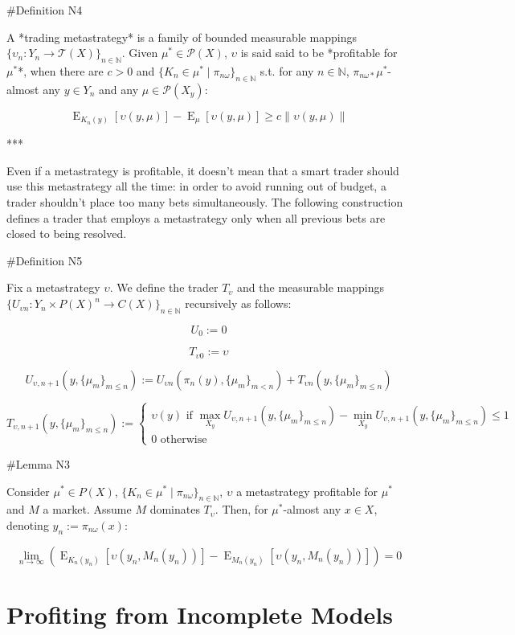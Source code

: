 \documentclass[a4paper]{article}
\DeclareMathOperator{\E}{E}
\newcommand{\Nats}{\mathbb{N}}
\newcommand{\Norm}[1]{\lVert #1 \rVert}
\newcommand{\Prob}{\mathcal{P}}
\newcommand{\T}{\mathcal{T}}
\begin{document}
\#Definition N4

A *trading metastrategy* is a family of bounded measurable mappings ${\{\upsilon_n: Y_n \rightarrow \T(X)\}_{n \in \Nats}}$. Given ${\mu^* \in \Prob(X)}$, ${\upsilon}$ is said said to be *profitable for ${\mu^*}$*, when there are ${c > 0}$ and ${\{K_n \in \mu^* \mid \pi_{n\omega}\}_{n \in \Nats}}$ s.t. for any ${n \in \Nats}$, ${\pi_{n\omega*}\mu^*}$-almost any ${y \in Y_n}$ and any ${\mu \in \Prob(X_y)}$:

$$\E_{K_n(y)}[\upsilon(y,\mu)] - \E_{\mu}[\upsilon(y,\mu)] \geq c \Norm{\upsilon(y,\mu)}$$

***

Even if a metastrategy is profitable, it doesn't mean that a smart trader should use this metastrategy all the time: in order to avoid running out of budget, a trader shouldn't place too many bets simultaneously. The following construction defines a trader that employs a metastrategy only when all previous bets are closed to being resolved.

\#Definition N5

Fix a metastrategy ${\upsilon}$. We define the trader ${T_\upsilon}$ and the measurable mappings ${\{U_{\upsilon  n}: Y_n \times P(X)^n \rightarrow C(X)\}_{n \in \Nats}}$ recursively as follows:
 
 $$U_0 := 0$$

$$T_{\upsilon0} := \upsilon$$

$$U_{\upsilon,n+1}(y, \{\mu_m\}_{m \leq n}) := U_{\upsilon n}(\pi_n(y), \{\mu_m\}_{m < n}) + T_{\upsilon n}(y, \{\mu_m\}_{m \leq n})$$

$$T_{\upsilon,n+1}(y, \{\mu_m\}_{m \leq n}) := \begin{cases}\upsilon(y) \text{ if } \max_{X_y} U_{\upsilon,n+1}(y,\{\mu_m\}_{m \leq n}) - \min_{X_y} U_{\upsilon,n+1}(y,\{\mu_m\}_{m \leq n})\leq 1\\0 \text{ otherwise}\end{cases}$$

\#Lemma N3

Consider ${\mu^* \in P(X)}$, ${\{K_n \in \mu^* \mid \pi_{n\omega}\}_{n \in \Nats}}$, ${\upsilon}$ a metastrategy profitable for ${\mu^*}$ and ${M}$ a market. Assume ${M}$ dominates ${T_\upsilon}$. Then, for ${\mu^*}$-almost any ${x \in X}$, denoting ${y_n:=\pi_{n\omega}(x)}$:

$$\lim_{n \rightarrow \infty} (\E_{K_n(y_n)}[\upsilon(y_n,M_n(y_n))]-\E_{M_n(y_n)}[\upsilon(y_n,M_n(y_n))])= 0$$

\section{Profiting from Incomplete Models}
\end{document}

